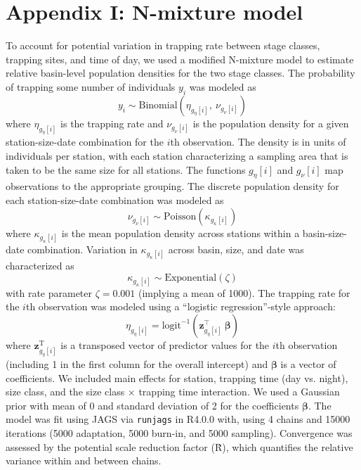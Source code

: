 \documentclass[11pt]{article}
\begin{document}
\section*{Appendix I: N-mixture model} 

To account for potential variation in trapping rate between stage classes,
trapping sites, and time of day, 
we used a modified N-mixture model to estimate relative basin-level population densities
for the two stage classes.
The probability of trapping some number of individuals $y_i$ 
was modeled as
%
\begin{equation}
  y_i \sim \text{Binomial}\left(\eta_{g_{\eta}[i]}, ~\nu_{g_{\nu}[i]}\right)
\end{equation}
%
where $\eta_{g_{\eta}[i]}$ is the trapping rate 
and $\nu_{g_{\nu}[i]}$ is the population density for a given 
station-size-date combination for the $i$th observation.
The density is in units of individuals per station, 
with each station characterizing a sampling area that is 
taken to be the same size for all stations.
The functions ${g_{\eta}[i]}$ and ${g_{\nu}[i]}$ map observations to the 
appropriate grouping. 
The discrete population density for each station-size-date combination was modeled as
%
\begin{equation}
  \nu_{g_{\nu}[i]} \sim \text{Poisson}\left(\kappa_{g_{\kappa}[i]}\right)
\end{equation}
%
where $\kappa_{g_{\kappa}[i]}$ is the mean population density across stations 
within a basin-size-date combination. 
Variation in $\kappa_{g_{\kappa}[i]}$ across basin, size, 
and date was characterized as 
%
\begin{equation}
  \kappa_{g_{\kappa}[i]} \sim 
    \text{Exponential}\left(\zeta \right)
\end{equation}
%
with rate parameter $\zeta = 0.001$ (implying a mean of 1000).
The trapping rate for the $i$th observation was modeled using a 
``logistic regression''-style approach:
%
\begin{equation}
  \eta_{g_{\eta}[i]} = 
    \text{logit}^{-1}\left(\mathbf{z}_{g_{\eta}[i]}^\top~{\boldsymbol\beta}\right)
\end{equation}
%
\noindent where $\mathbf{z}_{g_{\eta}[i]}^\text{T}$ is a transposed vector 
of predictor values for the $i$th observation
(including 1 in the first column for the overall intercept)
and $\boldsymbol\beta$ is a vector of coefficients. 
We included main effects for station, trapping time (day vs. night), size class,
and the size class $\times$ trapping time interaction.
We used a Gaussian prior with mean of 0 and standard deviation of 2 
for the coefficients $\boldsymbol\beta$.
The model was fit using JAGS via \texttt{runjags} in R4.0.0 with,
using 4 chains and 15000 iterations (5000 adaptation, 5000 burn-in, and 5000 sampling).
Convergence was assessed by the potential scale reduction factor (\^{R}),
which quantifies the relative variance within and between chains. 
\end{document}
